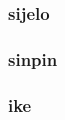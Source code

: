 \documentclass[14pt, a4paper]{extreport}
\begin{document}
%
%
%



%
%



      \subsubsection{sijelo}
      \subsubsection{sinpin}


      \subsubsection{ike}
\end{document}
